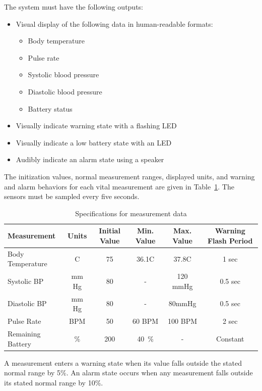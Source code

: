 \documentclass[12pt]{article} %
\begin{document}
\begin{itemize}[$$]
 \item The system must have the following outputs:
    \begin{itemize}[$\bullet$]
      \item Visual display of the following data in human-readable formats:
	\begin{itemize}
	\item Body temperature
	\item Pulse rate
	\item Systolic blood pressure
	\item Diastolic blood pressure
	\item Battery status
	\end{itemize}
      \item Visually indicate warning state with a flashing LED
      \item Visually indicate a low battery state with an LED
      \item Audibly indicate an alarm state using a speaker
    \end{itemize}
\end{itemize}

The initization values, normal measurement ranges, displayed units, and 
warning and alarm behaviors for each vital measurement are given in 
Table~\ref{tab:sensorDefs}. The sensors must be sampled every five seconds.\\

\begin{table}
  \centering
  \begin{tabular}{|l|*{5}{c}|}
    \hline
    Measurement & Units & Initial Value & Min. Value & Max. Value & Warning Flash Period \\ \hline
    Body Temperature & C & 75 & 36.1C & 37.8C & 1 sec \\ \hline
    Systolic BP  & mm Hg & 80 & - & 120 mmHg & 0.5 sec \\ \hline
    Diastolic BP & mm Hg & 80 & - & 80mmHg & 0.5 sec \\ \hline
    Pulse Rate & BPM & 50 & 60 BPM & 100 BPM & 2 sec \\ \hline
    Remaining Battery & \% & 200 & 40~\% & - & Constant \\ \hline
  \end{tabular}
  \caption{Specifications for measurement data}
  \label{tab:sensorDefs}
\end{table}

A measurement enters a warning state when its value falls outside the stated 
normal range by 5\%. An alarm state occurs when any measurement falls outside
 its stated normal range by 10\%.
\end{document}
